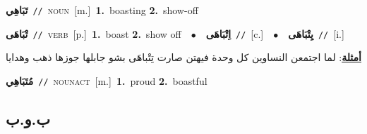 \documentclass[10pt,a4paper,twoside]{article} %
\begin{document}
\begin{multicols}{2}
{\setlength\topsep{0pt}\textbf{\foreignlanguage{arabic}{تَبَاهِي}}\ {\color{gray}\texttt{//}\color{black}}\ \textsc{noun}\ [m.]\ \textbf{1.}~boasting  \textbf{2.}~show-off\ } \vspace{2mm}

{\setlength\topsep{0pt}\textbf{\foreignlanguage{arabic}{تْبَاهَى}}\ {\color{gray}\texttt{//}\color{black}}\ \textsc{verb}\ [p.]\ \textbf{1.}~boast  \textbf{2.}~show off\ \ $\bullet$\ \ \setlength\topsep{0pt}\textbf{\foreignlanguage{arabic}{اِتْبَاهَى}}\ {\color{gray}\texttt{//}\color{black}}\ [c.]\ \ $\bullet$\ \ \setlength\topsep{0pt}\textbf{\foreignlanguage{arabic}{يِتْبَاهَى}}\ {\color{gray}\texttt{//}\color{black}}\ [i.]\  \begin{flushright}\color{gray}\foreignlanguage{arabic}{\textbf{\underline{\foreignlanguage{arabic}{أمثلة}}}: لما اجتمعن النساوين كل وحدة فيهتن صارت تِتْباهَى بشو جابلها جوزها ذهب وهدايا}\end{flushright}\color{black}} \vspace{2mm}

{\setlength\topsep{0pt}\textbf{\foreignlanguage{arabic}{مُتَبَاهِي}}\ {\color{gray}\texttt{//}\color{black}}\ \textsc{noun\textunderscore act}\ [m.]\ \textbf{1.}~proud  \textbf{2.}~boastful\ } \vspace{2mm}

\vspace{-3mm}
\subsection*{\color{blue}\foreignlanguage{arabic}{ب.و.ب}\color{blue}{}} 


\end{multicols}
\end{document}
